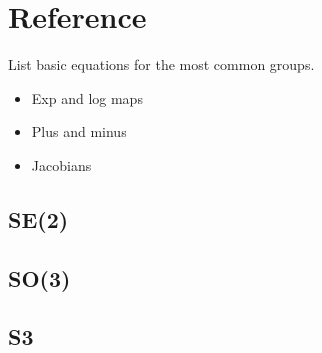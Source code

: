 \chapter{Reference}

List basic equations for the most common groups.

\begin{itemize}
  \item Exp and log maps
  \item Plus and minus
  \item Jacobians
\end{itemize}

\section{SE(2)}

\section{SO(3)}

\section{S3}

